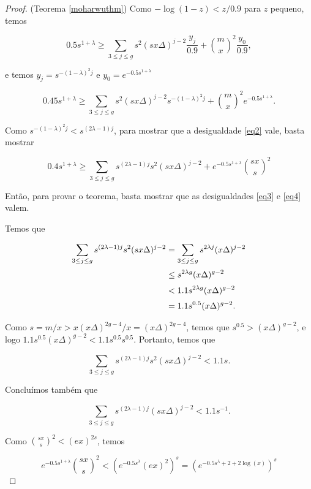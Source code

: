\documentclass{article}
\begin{document}
\begin{proof}{(Teorema \ref{moharwuthm})}
Como $-\log(1-z) < z/0.9$ para $z$ pequeno, temos

\[0.5s^{1+\lambda} \geq \sum_{3\leq j \leq g} s^2(sx\Delta)^{j-2}\frac{y_j}{0.9} + \binom{m}{x}^2\frac{y_0}{0.9},\]

e temos $y_j = s^{-(1-\lambda)^2j}$ e $y_0 = e^{-0.5s^{1+\lambda}}$

\[0.45s^{1+\lambda} \geq \sum_{3\leq j \leq g} s^2(sx\Delta)^{j-2} s^{-(1-\lambda)^2j} + \binom{m}{x}^2e^{-0.5s^{1+\lambda}}.\]

Como $s^{-(1-\lambda)^2j} < s^{(2\lambda - 1)j}$, para mostrar que a desigualdade \ref{eq2} vale, basta mostrar

\begin{equation}\label{eq4}
0.4s^{1+\lambda} \geq \sum_{3\leq j\leq g}s^{(2\lambda-1)j}s^2(sx\Delta)^{j-2}+e^{-0.5s^{1+\lambda}}\binom{sx}{s}^2
\end{equation}

Então, para provar o teorema, basta mostrar que as desigualdades \ref{eq3} e \ref{eq4} valem.

Temos que 

\begin{equation*}
\setlength{\jot}{5pt}
\begin{aligned}
\sum_{3\leq j\leq g}s^{(2\lambda-1)j}s^2(sx\Delta)^{j-2} & = \sum_{3\leq j\leq g}s^{2\lambda j}(x\Delta)^{j-2} \\
 & \leq s^{2\lambda g}(x\Delta)^{g-2} \\
 & < 1.1s^{2\lambda g}(x\Delta)^{g-2} \\
 & = 1.1s^{0.5}(x\Delta)^{g-2}.
\end{aligned}
\end{equation*}

Como $s = m/x > x(x\Delta)^{2g-4}/x = (x\Delta)^{2g-4}$, temos que $s^{0.5} > (x\Delta)^{g-2}$, e logo $1.1s^{0.5}(x\Delta)^{g-2} < 1.1s^{0.5}s^{0.5}$. Portanto, temos que

\begin{equation*}
\sum_{3\leq j\leq g}s^{(2\lambda-1)j}s^2(sx\Delta)^{j-2} < 1.1s.
\end{equation*}

Concluímos também que

\begin{equation*}
\sum_{3\leq j\leq g}s^{(2\lambda-1)j}(sx\Delta)^{j-2} < 1.1s^{-1}.
\end{equation*}

Como $\binom{sx}{s}^2 < (ex)^{2s}$, temos

\[e^{-0.5s^{1+\lambda}}\binom{sx}{s}^2 < \left(e^{-0.5s^{\lambda}}(ex)^2\right)^s = \left(e^{-0.5s^\lambda + 2 + 2\log(x)}\right)^s\]


\end{proof}
\end{document}
